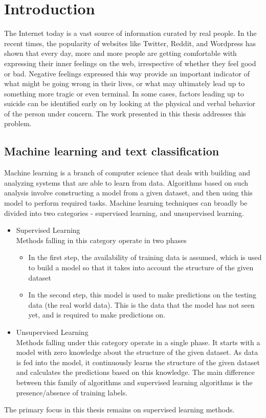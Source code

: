 \chapter{Introduction}
\label{chapter:Introduction}

The Internet today is a vast source of information curated by real people. In the recent times, the popularity of websites like Twitter, Reddit, and Wordpress has shown that every day, more and more people are getting comfortable with expressing their inner feelings on the web, irrespective of whether they feel good or bad. Negative feelings expressed this way provide an important indicator of what might be going wrong in their lives, or what may ultimately lead up to something more tragic or even terminal. In some cases, factors leading up to suicide can be identified early on by looking at the physical and verbal behavior of the person under concern. The work presented in this thesis addresses this problem.

\section{Machine learning and text classification}
Machine learning is a branch of computer science that deals with building and analyzing systems that are able to learn from data. Algorithms based on such analysis involve constructing a model from a given dataset, and then using this model to perform required tasks. Machine learning techniques can broadly be divided into two categories - supervised learning, and unsupervised learning.
\begin{itemize}
    \item{
    Supervised Learning\\
    Methods falling in this category operate in two phases
    \begin{itemize}
        \item{In the first step, the availability of training data is assumed, which is used to build a model so that it takes into account the structure of the given dataset}
        \item{In the second step, this model is used to make predictions on the testing data (the real world data). This is the data that the model has not seen yet, and is required to make predictions on.}
    \end{itemize}
    }
    \item{
    Unsupervised Learning\\
    Methods falling under this category operate in a single phase. It starts with a model with zero knowledge about the structure of the given dataset. As data is fed into the model, it continuously learns the structure of the given dataset and calculates the predictions based on this knowledge. The main difference between this family of algorithms and supervised learning algorithms is the presence/absence of training labels.
    }
\end{itemize}
The primary focus in this thesis remains on supervised learning methods.

